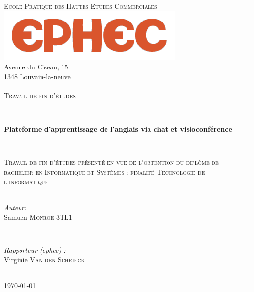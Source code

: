 \documentclass{report}
\begin{document}
\begin{titlepage}

\newcommand{\HRule}{\rule{\linewidth}{0.5mm}} %

\center %


\textsc{\LARGE Ecole Pratique des Hautes Etudes Commerciales }\\[1.5cm] %
\includegraphics[scale=0.7]{ephec.png}\\
Avenue du Ciseau, 15\\
1348 Louvain-la-neuve\\
\\[50pt]
\textsc{\Large Travail de fin d'études}\\[0.5cm] %


\HRule \\[0.4cm]
{ \huge \bfseries Plateforme d'apprentissage de l'anglais via chat et visioconférence}\\[0.4cm] %
\HRule \\[1.5cm]

\textsc{Travail de fin d’études présenté en vue de l’obtention du diplôme de bachelier en Informatique et Systèmes : finalité Technologie de l’informatique}\\

\\[90pt]

\begin{minipage}{0.4\textwidth}
\begin{flushleft} \large
\emph{Auteur:}\\
Samuen \textsc{Monroe} 3TL1 %
\end{flushleft}
\end{minipage}
~
\begin{minipage}{0.4\textwidth}
\begin{flushright} \large
\emph{Rapporteur (ephec) :} \\
Virginie \textsc{Van den Schrieck} %
\end{flushright}
\end{minipage}\\[4cm]



{\large \today}\\[3cm] %


\end{titlepage}
\end{document}
